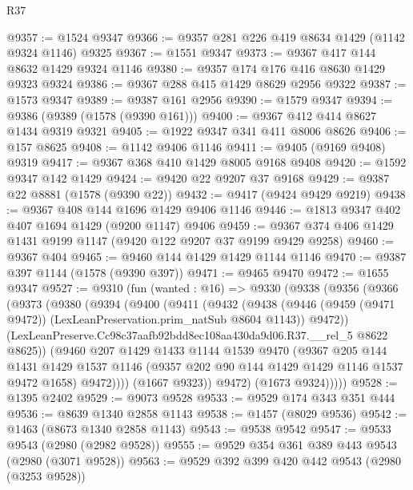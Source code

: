 \begin{lexlean}{R37}
\begin{coremodule}
@9357 := @1524 @9347
@9366 := @9357 @281 @226 @419 @8634 @1429 (@1142 @9324 @1146) @9325
@9367 := @1551 @9347
@9373 := @9367 @417 @144 @8632 @1429 @9324 @1146
@9380 := @9357 @174 @176 @416 @8630 @1429 @9323 @9324
@9386 := @9367 @288 @415 @1429 @8629 @2956 @9322
@9387 := @1573 @9347
@9389 := @9387 @161 @2956
@9390 := @1579 @9347
@9394 := @9386 (@9389 (@1578 (@9390 @161)))
@9400 := @9367 @412 @414 @8627 @1434 @9319 @9321
@9405 := @1922 @9347 @341 @411 @8006 @8626
@9406 := @157 @8625
@9408 := @1142 @9406 @1146
@9411 := @9405 (@9169 @9408) @9319
@9417 := @9367 @368 @410 @1429 @8005 @9168 @9408
@9420 := @1592 @9347 @142 @1429
@9424 := @9420 @22 @9207 @37 @9168
@9429 := @9387 @22 @8881 (@1578 (@9390 @22))
@9432 := @9417 (@9424 @9429 @9219)
@9438 := @9367 @408 @144 @1696 @1429 @9406 @1146
@9446 := @1813 @9347 @402 @407 @1694 @1429 (@9200 @1147) @9406
@9459 := @9367 @374 @406 @1429 @1431 @9199 @1147 (@9420 @122 @9207 @37 @9199 @9429 @9258)
@9460 := @9367 @404
@9465 := @9460 @144 @1429 @1429 @1144 @1146
@9470 := @9387 @397 @1144 (@1578 (@9390 @397))
@9471 := @9465 @9470
@9472 := @1655 @9347
@9527 := @9310
    (fun (wanted : @16) =>
    @9330
      (@9338
        (@9356
          (@9366
            (@9373
              (@9380
                (@9394
                  (@9400
                    (@9411
                      (@9432
                        (@9438
                          (@9446
                            (@9459 (@9471 @9472))
                            (LexLeanPreservation.prim_natSub @8604 @1143))
                          @9472))
                      (LexLeanPreserve.Cc98c37aafb92bdd8ec108aa430da9d06.R37.__rel_5 @8622 @8625))
                    (@9460
                      @207
                      @1429
                      @1433
                      @1144
                      @1539
                      @9470
                      (@9367
                        @205
                        @144
                        @1431
                        @1429
                        @1537
                        @1146
                        (@9357 @202 @90 @144 @1429 @1429 @1146 @1537 @9472 @1658)
                        @9472))))
                (@1667 @9323))
              @9472)
            (@1673 @9324)))))
@9528 := @1395 @2402
@9529 := @9073 @9528
@9533 := @9529 @174 @343 @351 @444
@9536 := @8639 @1340 @2858 @1143
@9538 := @1457 (@8029 @9536)
@9542 := @1463 (@8673 @1340 @2858 @1143)
@9543 := @9538 @9542
@9547 := @9533 @9543 (@2980 (@2982 @9528))
@9555 := @9529 @354 @361 @389 @443 @9543 (@2980 (@3071 @9528))
@9563 := @9529 @392 @399 @420 @442 @9543 (@2980 (@3253 @9528))

\end{coremodule}
\end{lexlean}
